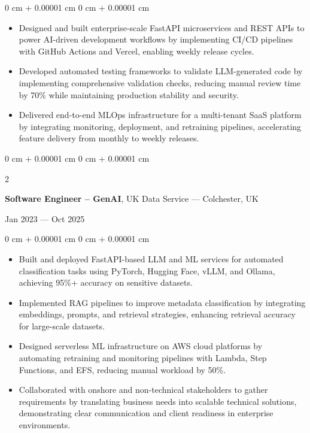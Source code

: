 \documentclass[6pt, letterpaper]{article}
\newenvironment{highlights}{
    \begin{itemize}[
        topsep=0.03 cm,
        parsep=0.03 cm,
        partopsep=0pt,
        itemsep=0pt,
        leftmargin=0 cm + 10pt
    ]
}{
    \end{itemize}
} %
\newenvironment{onecolentry}{
    \begin{adjustwidth}{
        0 cm + 0.00001 cm
    }{
        0 cm + 0.00001 cm
    }
}{
    \end{adjustwidth}
} %
\newenvironment{twocolentry}[2][]{
    \onecolentry
    \def\secondColumn{#2}
    \setcolumnwidth{\fill, 4.5 cm}
    \begin{paracol}{2}
}{
    \switchcolumn \raggedleft \secondColumn
    \end{paracol}
    \endonecolentry
} %
\begin{document}
        \begin{onecolentry}
        \begin{highlights}
            \item Designed and built enterprise-scale FastAPI microservices and REST APIs to power AI-driven development workflows by implementing CI/CD pipelines with GitHub Actions and Vercel, enabling weekly release cycles.
            \item Developed automated testing frameworks to validate LLM-generated code by implementing comprehensive validation checks, reducing manual review time by 70\% while maintaining production stability and security.
            \item Delivered end-to-end MLOps infrastructure for a multi-tenant SaaS platform by integrating monitoring, deployment, and retraining pipelines, accelerating feature delivery from monthly to weekly releases.
        \end{highlights}
        \end{onecolentry}

        \begin{twocolentry}{Jan 2023 --- Oct 2025}
        \textbf{Software Engineer – GenAI}, UK Data Service --- Colchester, UK
        \end{twocolentry}

        \begin{onecolentry}
        \begin{highlights}

            \item Built and deployed FastAPI-based LLM and ML services for automated classification tasks using PyTorch, Hugging Face, vLLM, and Ollama, achieving 95\%+ accuracy on sensitive datasets.
            \item Implemented RAG pipelines to improve metadata classification by integrating embeddings, prompts, and retrieval strategies, enhancing retrieval accuracy for large-scale datasets.
            \item Designed serverless ML infrastructure on AWS cloud platforms by automating retraining and monitoring pipelines with Lambda, Step Functions, and EFS, reducing manual workload by 50\%.
            \item Collaborated with onshore and non-technical stakeholders to gather requirements by translating business needs into scalable technical solutions, demonstrating clear communication and client readiness in enterprise environments.

        \end{highlights}
        \end{onecolentry}
\end{document}
